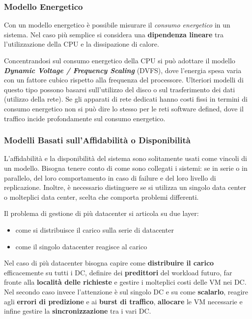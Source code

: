 \documentclass{article}
\begin{document}
		\subsubsection{Modello Energetico}\label{modello-energetico}
		
		Con un modello energetico è possibile misurare il \emph{consumo
		energetico} in un sistema. Nel caso più semplice si considera una
		\textbf{dipendenza lineare} tra l'utilizzazione della CPU e la dissipazione di calore.
		
		Concentrandosi sul consumo energetico della CPU si può adottare il modello \textbf{\emph{Dynamic Voltage
		/ Frequency Scaling}} (DVFS), dove l'energia spesa varia con un
		fattore cubico rispetto alla frequenza del processore. Ulteriori modelli
		di questo tipo possono basarsi sull'utilizzo del disco o sul
		trasferimento dei dati (utilizzo della rete).
		Se gli apparati di rete dedicati hanno costi fissi in termini di consumo energetico non si può dire lo stesso per le reti software defined, dove il traffico incide profondamente sul consumo energetico.
		
		
		
		\subsubsection{Modelli Basati sull'Affidabilità o Disponibilità}\label{modelli-basati-sullaffidabilituxe0-o-disponibilituxe0}
		
		L'affidabilità e la disponibilità del sistema sono
		solitamente usati come vincoli di un modello. Bisogna
		tenere conto di come sono collegati i sistemi: se in
		serie o in parallelo, del loro comportamento in caso di
		failure e del loro livello di replicazione. Inoltre, è
		necessario distinguere se si utilizza un singolo data
		center o molteplici data center, scelta che comporta
		problemi differenti.
		
		Il problema di gestione di più datacenter si articola su due layer:
		\begin{itemize}
			\item come si distribuisce il carico sulla serie di datacenter
			\item come il singolo datacenter reagisce al carico
		\end{itemize}
		Nel caso di più datacenter bisogna capire come \textbf{distribuire il carico} efficacemente su tutti i DC, definire dei \textbf{predittori} del workload futuro, far fronte alla \textbf{località delle richieste} e gestire i molteplici costi delle VM nei DC.
		Nel secondo caso invece l'attenzione è sul singolo DC e su come \textbf{scalarlo}, reagire agli \textbf{errori di predizione} e ai \textbf{burst di traffico}, \textbf{allocare} le VM necessarie e infine gestire la \textbf{sincronizzazione} tra i vari DC.
		
\end{document}
